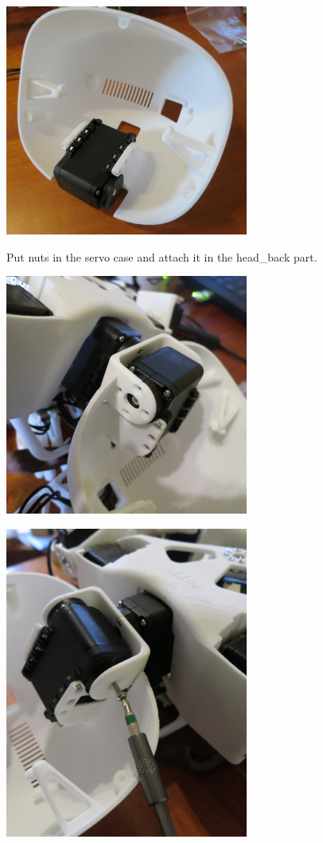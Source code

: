 \documentclass{article}
\begin{document}
 
 \begin{center}
  \includegraphics[width=0.6\textwidth]{neck2}
 \end{center}
 
 Put  nuts in the servo case and attach it in the head\_back part.
 
  \begin{center}
  \includegraphics[width=0.6\textwidth]{neck3}
 \end{center}

  \begin{center}
  \includegraphics[width=0.6\textwidth]{neck4}\\
 \end{center}
\end{document}
